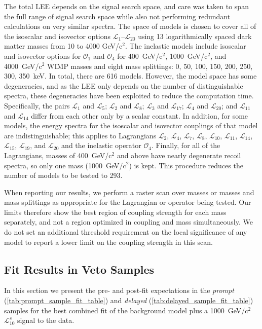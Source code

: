 The total LEE depends on the signal search space, and care was taken to span the full range of signal search space while also not performing redundant calculations on very similar spectra.
The space of models is chosen to cover all of the isoscalar and isovector options $\mathcal{L}_1$--$\mathcal{L}_{20}$ using 13 logarithmically spaced dark matter masses from 10 to 4000 GeV/c$^2$. 
The inelastic models include isoscalar and isovector options for $\mathcal{O}_1$ and $\mathcal{O}_4$ for 400~GeV/c$^2$, 1000~GeV/c$^2$, and 4000~GeV/c$^2$ WIMP masses and eight mass splittings: 0, 50, 100, 150, 200, 250, 300, 350~keV. 
In total, there are 616 models. 
However, the model space has some degeneracies, and as the LEE only depends on the number of distinguishable spectra, these degeneracies have been exploited to reduce the computation time.
Specifically, the pairs $\mathcal{L}_1$ and $\mathcal{L}_5$; $\mathcal{L}_2$ and $\mathcal{L}_8$; $\mathcal{L}_3$ and $\mathcal{L}_{17}$; $\mathcal{L}_4$ and $\mathcal{L}_{20}$; and $\mathcal{L}_{11}$ and $\mathcal{L}_{14}$ differ from each other only by a scalar constant. 
In addition, for some models, the energy spectra for the isoscalar and isovector couplings of that model are indistinguishable; this applies to Lagrangians $\mathcal{L}_2$, $\mathcal{L}_4$, $\mathcal{L}_7$, $\mathcal{L}_8$, $\mathcal{L}_{10}$, $\mathcal{L}_{11}$, $\mathcal{L}_{14}$, $\mathcal{L}_{15}$, $\mathcal{L}_{19}$, and $\mathcal{L}_{20}$ and the inelastic operator $\mathcal{O}_4$.
Finally, for all of the Lagrangians, masses of  400~GeV/c$^2$ and above have nearly degenerate recoil spectra, so only one mass (1000~GeV/c$^2$) is kept. 
This procedure reduces the number of models to be tested to 293.

When reporting our results, we perform a raster scan over masses or masses and mass splittings as appropriate for the Lagrangian or operator being tested. Our limits therefore show the best region of coupling strength for each mass separately, and not a region optimized in coupling and mass simultaneously. We do not set an additional threshold requirement on the local significance of any model to report a lower limit on the coupling strength in this scan. 

\subsection{Fit Results in Veto Samples}
In this section we present the pre- and post-fit expectations in the \emph{prompt} (\autoref{tab:prompt_sample_fit_table}) and \emph{delayed} (\autoref{tab:delayed_sample_fit_table}) samples for the best combined fit of the background model plus a 1000~GeV/c$^2$ $\mathcal{L}_{10}^s$ signal to the data. 

